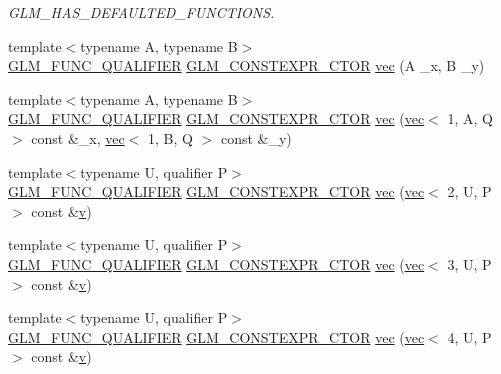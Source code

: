 \begin{DoxyCompactItemize}
\begin{DoxyCompactList}\small\item\em G\+L\+M\+\_\+\+H\+A\+S\+\_\+\+D\+E\+F\+A\+U\+L\+T\+E\+D\+\_\+\+F\+U\+N\+C\+T\+I\+O\+NS. \end{DoxyCompactList}\item 
{\footnotesize template$<$typename A, typename B$>$ }\\\hyperlink{setup_8hpp_a33fdea6f91c5f834105f7415e2a64407}{G\+L\+M\+\_\+\+F\+U\+N\+C\+\_\+\+Q\+U\+A\+L\+I\+F\+I\+ER} \hyperlink{setup_8hpp_ad34178a09666081abdb573c14d1f4a5a}{G\+L\+M\+\_\+\+C\+O\+N\+S\+T\+E\+X\+P\+R\+\_\+\+C\+T\+OR} \hyperlink{structglm_1_1vec_3_012_00_01_t_00_01_q_01_4_a161096cd80858035c7375517507e97c4}{vec} (A \+\_\+x, B \+\_\+y)
\item 
{\footnotesize template$<$typename A, typename B$>$ }\\\hyperlink{setup_8hpp_a33fdea6f91c5f834105f7415e2a64407}{G\+L\+M\+\_\+\+F\+U\+N\+C\+\_\+\+Q\+U\+A\+L\+I\+F\+I\+ER} \hyperlink{setup_8hpp_ad34178a09666081abdb573c14d1f4a5a}{G\+L\+M\+\_\+\+C\+O\+N\+S\+T\+E\+X\+P\+R\+\_\+\+C\+T\+OR} \hyperlink{structglm_1_1vec_3_012_00_01_t_00_01_q_01_4_a2801c2c65b9d873d5d5008688f7339a6}{vec} (\hyperlink{structglm_1_1vec}{vec}$<$ 1, A, Q $>$ const \&\+\_\+x, \hyperlink{structglm_1_1vec}{vec}$<$ 1, B, Q $>$ const \&\+\_\+y)
\item 
{\footnotesize template$<$typename U, qualifier P$>$ }\\\hyperlink{setup_8hpp_a33fdea6f91c5f834105f7415e2a64407}{G\+L\+M\+\_\+\+F\+U\+N\+C\+\_\+\+Q\+U\+A\+L\+I\+F\+I\+ER} \hyperlink{setup_8hpp_ad34178a09666081abdb573c14d1f4a5a}{G\+L\+M\+\_\+\+C\+O\+N\+S\+T\+E\+X\+P\+R\+\_\+\+C\+T\+OR} \hyperlink{structglm_1_1vec_3_012_00_01_t_00_01_q_01_4_aa42a169b552cd4f61ee71641723d2d9b}{vec} (\hyperlink{structglm_1_1vec}{vec}$<$ 2, U, P $>$ const \&\hyperlink{_s_d_l__opengl_8h_a10a82eabcb59d2fcd74acee063775f90}{v})
\item 
{\footnotesize template$<$typename U, qualifier P$>$ }\\\hyperlink{setup_8hpp_a33fdea6f91c5f834105f7415e2a64407}{G\+L\+M\+\_\+\+F\+U\+N\+C\+\_\+\+Q\+U\+A\+L\+I\+F\+I\+ER} \hyperlink{setup_8hpp_ad34178a09666081abdb573c14d1f4a5a}{G\+L\+M\+\_\+\+C\+O\+N\+S\+T\+E\+X\+P\+R\+\_\+\+C\+T\+OR} \hyperlink{structglm_1_1vec_3_012_00_01_t_00_01_q_01_4_ac6f3c81265603dd5c06c75776911aff4}{vec} (\hyperlink{structglm_1_1vec}{vec}$<$ 3, U, P $>$ const \&\hyperlink{_s_d_l__opengl_8h_a10a82eabcb59d2fcd74acee063775f90}{v})
\item 
{\footnotesize template$<$typename U, qualifier P$>$ }\\\hyperlink{setup_8hpp_a33fdea6f91c5f834105f7415e2a64407}{G\+L\+M\+\_\+\+F\+U\+N\+C\+\_\+\+Q\+U\+A\+L\+I\+F\+I\+ER} \hyperlink{setup_8hpp_ad34178a09666081abdb573c14d1f4a5a}{G\+L\+M\+\_\+\+C\+O\+N\+S\+T\+E\+X\+P\+R\+\_\+\+C\+T\+OR} \hyperlink{structglm_1_1vec_3_012_00_01_t_00_01_q_01_4_a369d48c9ccf09e6ef21f17178abf9f81}{vec} (\hyperlink{structglm_1_1vec}{vec}$<$ 4, U, P $>$ const \&\hyperlink{_s_d_l__opengl_8h_a10a82eabcb59d2fcd74acee063775f90}{v})

\end{DoxyCompactItemize}
